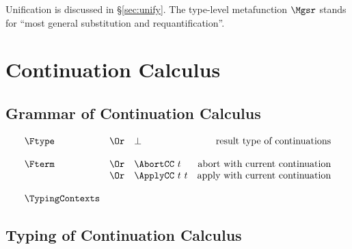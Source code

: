 \documentclass{amsart}
\begin{document}
\nc{}

\nc{}

\nc{}

\Tautology

\SuperIntroduction

\SuperElimination

Unification is discussed in \S\ref{sec:unify}. The type-level
metafunction $\Mgsr$ stands for ``most general substitution and
requantification''.

\ExistentialIntroduction

\section{Continuation Calculus}

\subsection{Grammar of Continuation Calculus}

\nc{}

\[
\begin{array}{lclr}
\Ftype
&\Or& \bot & \mbox{result type of continuations} \\
\\
\Fterm
&\Or& \AbortCC~t & \mbox{abort with current continuation} \\
&\Or& \ApplyCC~t~t & \mbox{apply with current continuation} \\
\\
\TypingContexts
\end{array}
\]

\subsection{Typing of Continuation Calculus}
~
\end{document}
